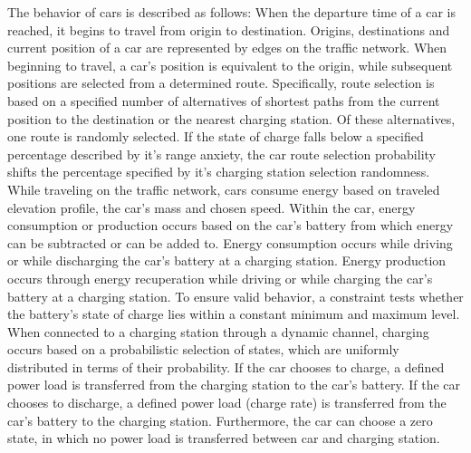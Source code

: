 




The behavior of cars is described as follows: When the departure time of a car is reached, it begins to travel from origin to destination. Origins, destinations and current position of a car are represented by edges on the traffic network.  When beginning to travel, a car's position is equivalent to the origin, while subsequent positions are selected from a determined route. 
Specifically, route selection is based on a specified number of alternatives of shortest paths from the current position to the destination or the nearest charging station. Of these alternatives, one route is randomly selected. 
If the state of charge falls below a specified percentage described by it's range anxiety, the car route selection probability shifts the percentage specified by it's charging station selection randomness.
While traveling on the traffic network, cars consume energy based on traveled elevation profile, the car's mass and chosen speed. Within the car, energy consumption or production occurs based on the car's battery from which energy can be subtracted or can be added to. Energy consumption occurs while driving or while discharging the car's battery at a charging station. Energy production occurs through energy recuperation while driving or while charging the car's battery at a charging station. To ensure valid behavior, a constraint tests whether the battery's state of charge lies within a constant minimum and maximum level.
When connected to a charging station through a dynamic channel, charging occurs based on a probabilistic selection of states, which are uniformly distributed in terms of their probability. If the car chooses to charge, a defined power load is transferred from the charging station to the car's battery. If the car chooses to discharge, a defined power load (charge rate) is transferred from the car's battery to the charging station. Furthermore, the car can choose a zero state, in which no power load is transferred between car and charging station.

